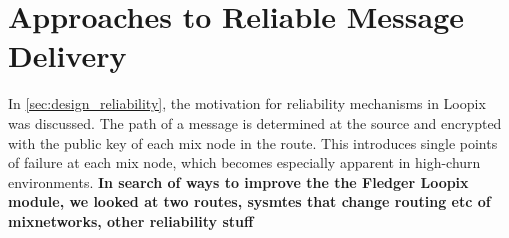 \documentclass[a4paper,11pt,oneside]{report}
\begin{document}



\section{Approaches to Reliable Message Delivery}
\label{sec:reliable_message_delivery}
In \autoref{sec:design_reliability}, the motivation for reliability mechanisms in Loopix was discussed. The path of a message is determined at the source and encrypted with the public key of each mix node in the route. This introduces single points of failure at each mix node, which becomes especially apparent in high-churn environments. \textbf{In search of ways to improve the the Fledger Loopix module,  we looked at two routes, sysmtes that change routing etc of mixnetworks, other reliability stuff}
\end{document}
